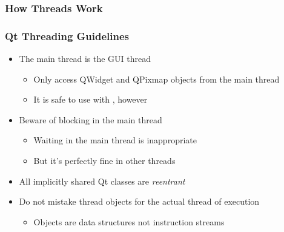 
\begin{slide}
\frametitle{How Threads Work}

\vspace{3em}

\end{slide}


\begin{slide}
\frametitle{Qt Threading Guidelines}

\begin{itemize}
\item The main thread is the GUI thread
  \begin{itemize}
  \item Only access QWidget and QPixmap objects from the main thread
  \item It is safe to use  with , however
  \end{itemize}
\item Beware of blocking in the main thread
  \begin{itemize}
  \item Waiting in the main thread is inappropriate
  \item But it's perfectly fine in other threads
  \end{itemize}
\item All implicitly shared Qt classes are \textit{reentrant}
\item Do not mistake thread objects for the actual thread of execution
  \begin{itemize}
  \item Objects are data structures not instruction streams
  \end{itemize}
\end{itemize}

\end{slide}


